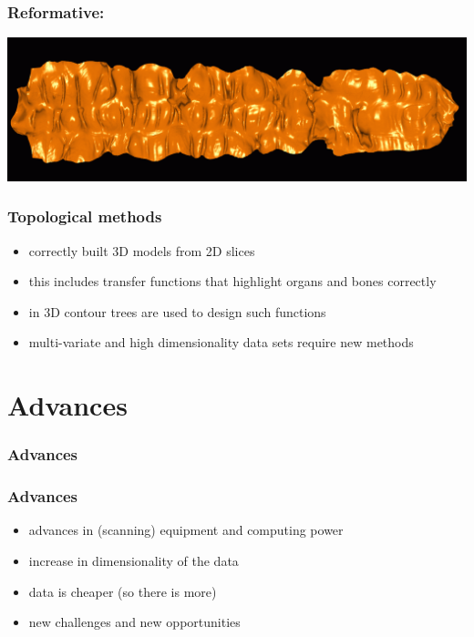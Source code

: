 \documentclass{beamer}
\begin{document}
\begin{frame}
	\frametitle{Reformative:} %
	\includegraphics[width=\textwidth]{images/colon}
\end{frame}

\begin{frame}
	\frametitle{Topological methods}
	\begin{itemize}
		\item correctly built 3D models from 2D slices
		\item this includes transfer functions that highlight organs and bones
correctly
		\item in 3D contour trees are used to design such functions
		\item multi-variate and high dimensionality data sets require new
methods
	\end{itemize}
\end{frame}


\section{Advances}

\begin{frame}
	\frametitle{Advances}
\end{frame}

\begin{frame}
	\frametitle{Advances}
		\begin{itemize}
			\item advances in (scanning) equipment and computing power
			\item increase in dimensionality of the data
			\item data is cheaper (so there is more)
			\item new challenges and new opportunities
		\end{itemize}
\end{frame}
\end{document}
